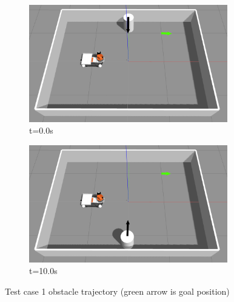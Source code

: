 \begin{figure}[ht]
    \centering
    \begin{subfigure}[b]{0.50\linewidth}
        \centering
        \includegraphics[width=0.95\textwidth]{images/test_case_1/exp1.png}
        \caption{t=0.0s}
    \end{subfigure}%
    \begin{subfigure}[b]{0.50\linewidth}
        \centering
        \includegraphics[width=0.95\textwidth]{images/test_case_1/exp3.png}
        \caption{t=10.0s}
    \end{subfigure}%
    \caption{Test case 1 obstacle trajectory (green arrow is goal position)}\label{fig:single_obs_single_room}
\end{figure}

